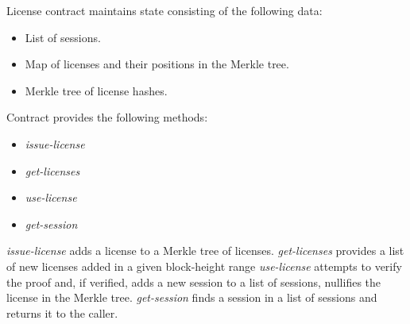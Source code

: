 \begin{flushleft}
License contract maintains state consisting of the following data:
\end{flushleft}

\begin{itemize}%
	\item List of sessions.
	\item Map of licenses and their positions in the Merkle tree.
	\item Merkle tree of license hashes.
\end{itemize}


\begin{flushleft}
Contract provides the following methods:
\end{flushleft}

\begin{itemize}%
	\item \textit{issue-license}
	\item \textit{get-licenses}
	\item \textit{use-license}
	\item \textit{get-session}
\end{itemize}


\begin{flushleft}
\textit{issue-license} adds a license to a Merkle tree of licenses. \textit{get-licenses} provides a list of new licenses added in a given block-height range \textit{use-license} attempts to verify the proof and, if verified, adds a new session to a list of sessions, nullifies the license in the Merkle tree. \textit{get-session} finds a session in a list of sessions and returns it to the caller.
\end{flushleft}


